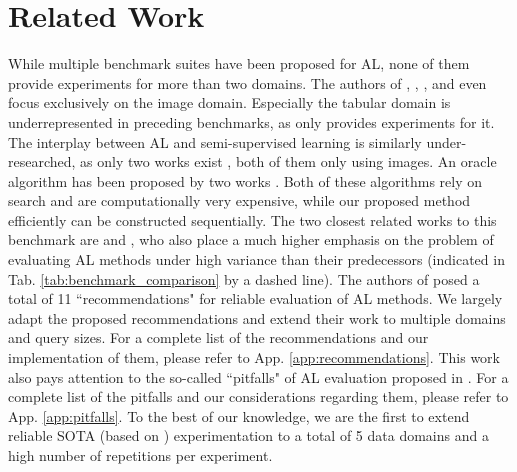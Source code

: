 \documentclass[]{article}
\begin{document}
\section{Related Work}
While multiple benchmark suites have been proposed for AL, none of them provide experiments for more than two domains.
The authors of \cite{beck2021effective}, \cite{munjal2022towards}, \cite{li2022empirical}, \cite{ji2023randomness} and \cite{luth2024navigating} even focus exclusively on the image domain.
Especially the tabular domain is underrepresented in preceding benchmarks, as only \cite{zhan2022comparative} provides experiments for it.
The interplay between AL and semi-supervised learning is similarly under-researched, as only two works exist \cite{li2022empirical, luth2024navigating}, both of them only using images.
An oracle algorithm has been proposed by two works \cite{zhou2021towards, zhan2022comparative}. 
Both of these algorithms rely on search and are computationally very expensive, while our proposed method efficiently can be constructed sequentially.
The two closest related works to this benchmark are \cite{ji2023randomness} and \cite{luth2024navigating}, who also place a much higher emphasis on the problem of evaluating AL methods under high variance than their predecessors (indicated in Tab. \ref{tab:benchmark_comparison} by a dashed line).
The authors of \cite{ji2023randomness} posed a total of 11 ``recommendations" for reliable evaluation of AL methods.
We largely adapt the proposed recommendations and extend their work to multiple domains and query sizes.
For a complete list of the recommendations and our implementation of them, please refer to App. \ref{app:recommendations}.
This work also pays attention to the so-called ``pitfalls" of AL evaluation proposed in \cite{luth2024navigating}.
For a complete list of the pitfalls and our considerations regarding them, please refer to App. \ref{app:pitfalls}.
To the best of our knowledge, we are the first to extend reliable SOTA (based on \cite{ji2023randomness, luth2024navigating}) experimentation to a total of 5 data domains and a high number of repetitions per experiment.
\end{document}
